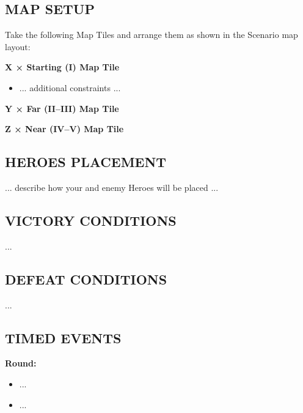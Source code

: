 \begin{multicols*}{2}
\subsection*{\MakeUppercase{Map Setup}}

Take the following Map Tiles and arrange them as shown in the Scenario map layout:

\textbf{X × Starting (I) Map Tile}
\begin{itemize}
    \item ... additional constraints ...
\end{itemize}

\textbf{Y × Far (II--III) Map Tile}

\textbf{Z × Near (IV--V) Map Tile}

\subsection*{\MakeUppercase{Heroes Placement}}

... describe how your and enemy Heroes will be placed ...

\subsection*{\MakeUppercase{Victory Conditions}}
...

\subsection*{\MakeUppercase{Defeat Conditions}}
...

\subsection*{\MakeUppercase{Timed Events}}

%

\textbf{ Round:}
\begin{itemize}
  \item ...
  \item ...
\end{itemize}

%
%
%


\end{multicols*}
